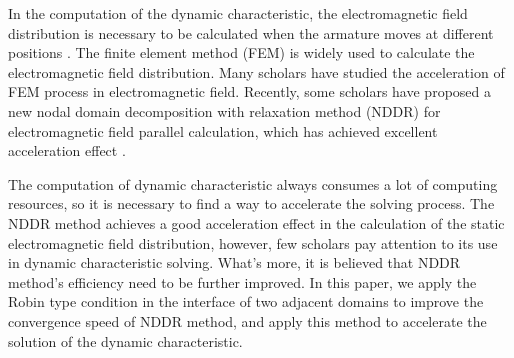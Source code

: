\documentclass[journal,transmag]{IEEEtran}
\begin{document}
In the computation of the dynamic characteristic, the electromagnetic field distribution is necessary to be calculated when the armature moves at different positions \cite{IEEEhowto:You}. The finite element method (FEM) is widely used to calculate the electromagnetic field distribution. Many scholars have studied the acceleration of FEM process in electromagnetic field. Recently, some scholars have proposed a new nodal domain decomposition with relaxation method (NDDR) for electromagnetic field parallel calculation, which has achieved excellent acceleration effect  \cite{IEEEhowto:Liu}.

The computation of dynamic characteristic always consumes a lot of computing resources, so it is necessary to find a way to accelerate the solving process. The NDDR method achieves a good acceleration effect in the calculation of the static electromagnetic field distribution, however, few scholars pay attention to its use in dynamic characteristic solving. What's more, it is believed that NDDR method's efficiency need to be further improved. In this paper, we apply the Robin type condition in the interface of two adjacent domains to improve the convergence speed of NDDR method, and apply this method to accelerate the solution of the dynamic characteristic. 
\end{document}

